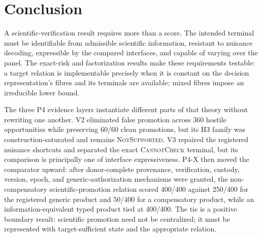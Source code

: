 \section{Conclusion}
A scientific-verification result requires more than a score.  The intended
terminal must be identifiable from admissible scientific information, resistant
to nuisance decoding, expressible by the compared interfaces, and capable of
varying over the panel.  The exact-risk and factorization results make these
requirements testable: a target relation is implementable precisely when it is
constant on the decision representation's fibres and its terminals are
available; mixed fibres impose an irreducible lower bound.

The three P4 evidence layers instantiate different parts of that theory without
rewriting one another.  V2 eliminated false promotion across 360 hostile
opportunities while preserving 60/60 clean promotions, but its H3 family was
construction-saturated and remains \textsc{NotSupported}.  V3 repaired the
registered nuisance shortcuts and separated the exact \textsc{CannotCheck}
terminal, but its comparison is principally one of interface expressiveness.
P4-X then moved the comparator upward: after donor-complete provenance,
verification, custody, version, epoch, and generic-authorization mechanisms were
granted, the non-compensatory scientific-promotion relation scored 400/400
against 250/400 for the registered generic product and 50/400 for a compensatory
product, while an information-equivalent typed product tied at 400/400.  The tie
is a positive boundary result: scientific promotion need not be centralized;
it must be represented with target-sufficient state and the appropriate
relation.

